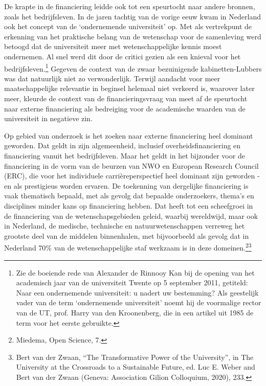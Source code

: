 \documentclass[empirical, authordate, ]{new-jote-article}
\begin{document}
	De krapte in de financiering leidde ook tot een speurtocht naar andere bronnen, zoals het bedrijfsleven. In de jaren tachtig van de vorige eeuw kwam in Nederland ook het concept van de ‘ondernemende universiteit' op. Met als vertrekpunt de erkenning van het praktische belang van de wetenschap voor de samenleving werd betoogd dat de universiteit meer met wetenschappelijke kennis moest ondernemen. Al snel werd dit door de critici gezien als een knieval voor het bedrijfsleven.\footnote{Zie de boeiende rede van Alexander de Rinnooy Kan bij de opening van het academisch jaar van de universiteit Twente op 5 september 2011, getiteld: Naar een ondernemende universiteit: u nadert uw bestemming? Als geestelijk vader van de term ‘ondernemende universiteit' noemt hij de voormalige rector van de UT, prof. Harry van den Kroonenberg, die in een artikel uit 1985 de term voor het eerste gebruikte.} Gegeven de context van de zwaar bezuinigende kabinetten-Lubbers was dat natuurlijk niet zo verwonderlijk. Terwijl aandacht voor meer maatschappelijke relevantie in beginsel helemaal niet verkeerd is, waarover later meer, kleurde de context van de financieringsvraag van meet af de speurtocht naar externe financiering als bedreiging voor de academische waarden van de universiteit in negatieve zin.



	Op gebied van onderzoek is het zoeken naar externe financiering heel dominant geworden. Dat geldt in zijn algemeenheid, inclusief overheidsfinanciering en financiering vanuit het bedrijfsleven. Maar het geldt in het bijzonder voor de financiering in de vorm van de beurzen van NWO en European Research Council (ERC), die voor het individuele carrièreperspectief heel dominant zijn geworden - en als prestigieus worden ervaren. De toekenning van dergelijke financiering is vaak thematisch bepaald, met als gevolg dat bepaalde onderzoekers, thema's en disciplines minder kans op financiering hebben. Dat heeft tot een scheefgroei in de financiering van de wetenschapsgebieden geleid, waarbij wereldwijd, maar ook in Nederland, de medische, technische en natuurwetenschappen verreweg het grootste deel van de middelen binnenhalen, met bijvoorbeeld als gevolg dat in Nederland 70\% van de wetenschappelijke staf werkzaam is in deze domeinen.\footnote{Miedema, Open Science, 7.}\textsuperscript{\fbox{,}}\footnote{Bert van der Zwaan, “The Transformative Power of the University”, in The University at the Crossroads to a Sustainable Future, ed. Luc E. Weber and Bert van der Zwaan (Geneva: Association Gilion Colloquium, 2020), 233.}
\end{document}
